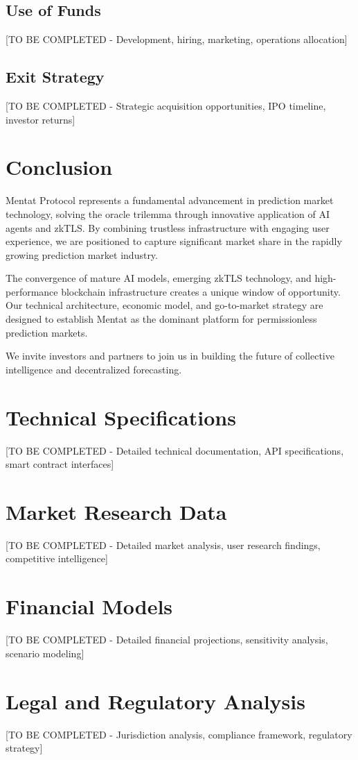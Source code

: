 \documentclass[11pt,a4paper]{article}
\begin{document}
\subsection{Use of Funds}
[TO BE COMPLETED - Development, hiring, marketing, operations allocation]

\subsection{Exit Strategy}
[TO BE COMPLETED - Strategic acquisition opportunities, IPO timeline, investor returns]

\section{Conclusion}

Mentat Protocol represents a fundamental advancement in prediction market technology, solving the oracle trilemma through innovative application of AI agents and zkTLS. By combining trustless infrastructure with engaging user experience, we are positioned to capture significant market share in the rapidly growing prediction market industry.

The convergence of mature AI models, emerging zkTLS technology, and high-performance blockchain infrastructure creates a unique window of opportunity. Our technical architecture, economic model, and go-to-market strategy are designed to establish Mentat as the dominant platform for permissionless prediction markets.

We invite investors and partners to join us in building the future of collective intelligence and decentralized forecasting.

\newpage
\appendix

\section{Technical Specifications}
[TO BE COMPLETED - Detailed technical documentation, API specifications, smart contract interfaces]

\section{Market Research Data}
[TO BE COMPLETED - Detailed market analysis, user research findings, competitive intelligence]

\section{Financial Models}
[TO BE COMPLETED - Detailed financial projections, sensitivity analysis, scenario modeling]

\section{Legal and Regulatory Analysis}
[TO BE COMPLETED - Jurisdiction analysis, compliance framework, regulatory strategy]



\end{document}
